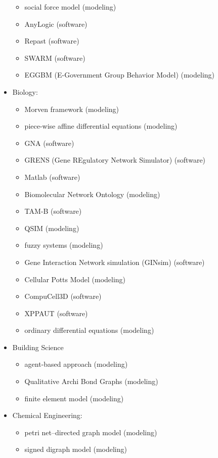 \documentclass[utf8]{gradu3}
\begin{document}
\begin{itemize}
\begin{itemize}
        \item social force model (modeling)
        \item AnyLogic (software)
        \item Repast (software)
        \item SWARM (software)
        \item EGGBM (E-Government Group Behavior Model) (modeling)
    \end{itemize}
    \item Biology:
    \begin{itemize}
        \item Morven framework (modeling)
        \item piece-wise affine differential equations (modeling)
        \item GNA (software)
        \item GRENS (Gene REgulatory Network Simulator) (software)
        \item Matlab (software)
        \item Biomolecular Network Ontology (modeling)
        \item TAM-B (software)
        \item QSIM (modeling)
        \item fuzzy systems (modeling)
        \item Gene Interaction Network simulation (GINsim) (software)
        \item Cellular Potts Model (modeling)
        \item CompuCell3D (software)
        \item XPPAUT (software)
        \item ordinary differential equations (modeling)
    \end{itemize}
    \item Building Science
    \begin{itemize}
        \item agent-based approach (modeling)
        \item Qualitative Archi Bond Graphs (modeling)
        \item finite element model (modeling)
    \end{itemize}
    \item Chemical Engineering:
    \begin{itemize}
        \item petri net–directed graph model (modeling)
        \item signed digraph model (modeling)

\end{itemize}
\end{itemize}
\end{document}
